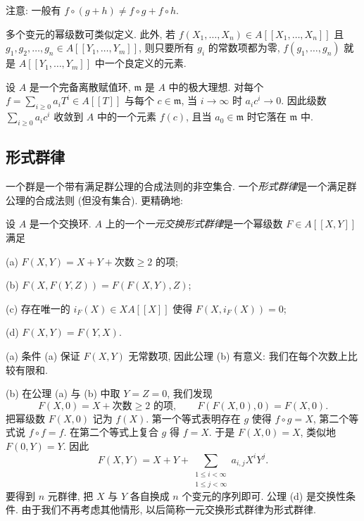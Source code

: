 注意: 一般有 $f\circ(g+h)\neq f\circ g+f\circ h$.

多个变元的幂级数可类似定义. 此外, 若 $f(X_1,\ldots,X_n)\in A[[X_1,\ldots,X_n]]$ 且 $g_1,g_2,\ldots,g_n\in A[[Y_1,\ldots,Y_m]]$, 则只要所有 $g_i$ 的常数项都为零, $f(g_1,\ldots,g_n)$ 就是 $A[[Y_1,\ldots,Y_m]]$ 中一个良定义的元素.

\begin{remark}\label{rem:2.2}
设 $A$ 是一个完备离散赋值环, $\mathfrak{m}$ 是 $A$ 中的极大理想. 对每个 $f=\sum_{i\ge 0}a_i T^i\in A[[T]]$ 与每个 $c\in\mathfrak{m}$, 当 $i\to\infty$ 时 $a_i c^i\to 0$. 因此级数 $\sum_{i\ge 0}a_i c^i$ 收敛到 $A$ 中的一个元素 $f(c)$, 且当 $a_0\in\mathfrak{m}$ 时它落在 $\mathfrak{m}$ 中.
\end{remark}

\subsection*{形式群律}

一个群是一个带有满足群公理的合成法则的非空集合. 一个\emph{形式群律}是一个满足群公理的合成法则 (但没有集合). 更精确地:

\begin{definition}\label{def:2.3}
设 $A$ 是一个交换环. $A$ 上的一个\emph{一元交换形式群律}是一个幂级数 $F\in A[[X,Y]]$ 满足

(a) $F(X,Y)=X+Y+\text{次数}\ge 2\text{ 的项}$;

(b) $F(X,F(Y,Z))=F(F(X,Y),Z)$;

(c) 存在唯一的 $i_F(X)\in XA[[X]]$ 使得 $F(X,i_F(X))=0$;

(d) $F(X,Y)=F(Y,X)$.
\end{definition}

\begin{remark}\label{rem:2.4}
(a) 条件 (a) 保证 $F(X,Y)$ 无常数项, 因此公理 (b) 有意义: 我们在每个次数上比较有限和.

(b) 在公理 (a) 与 (b) 中取 $Y=Z=0$, 我们发现
\[
F(X,0)=X+\text{次数}\ge 2\text{ 的项},\qquad F(F(X,0),0)=F(X,0).
\]
把幂级数 $F(X,0)$ 记为 $f(X)$. 第一个等式表明存在 $g$ 使得 $f\circ g=X$, 第二个等式说 $f\circ f=f$. 在第二个等式上复合 $g$ 得 $f=X$. 于是 $F(X,0)=X$, 类似地 $F(0,Y)=Y$. 因此
\[
F(X,Y)=X+Y+\sum_{\substack{1\le i<\infty\\ 1\le j<\infty}}a_{i,j}X^iY^j.
\]
要得到 $n$ 元群律, 把 $X$ 与 $Y$ 各自换成 $n$ 个变元的序列即可. 公理 (d) 是交换性条件. 由于我们不再考虑其他情形, 以后简称一元交换形式群律为形式群律.
\end{remark}

